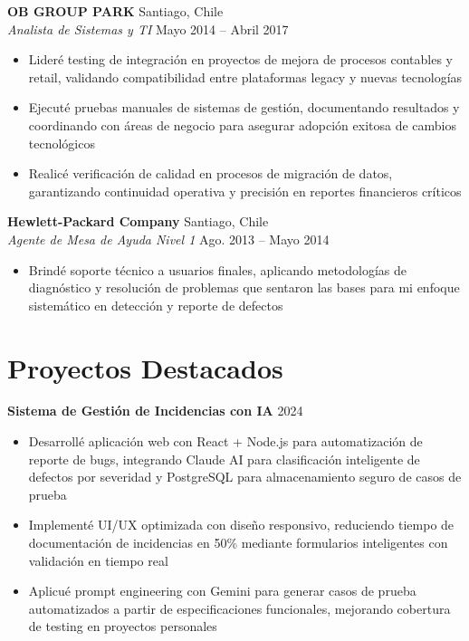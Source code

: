 \documentclass[11pt,letterpaper]{article}
\begin{document}
\vspace{2pt}
\textbf{OB GROUP PARK} \hfill Santiago, Chile\\
\textit{Analista de Sistemas y TI} \hfill Mayo 2014 – Abril 2017
\begin{itemize}
  \item Lideré testing de integración en proyectos de mejora de procesos contables y retail, validando compatibilidad entre plataformas legacy y nuevas tecnologías
  \item Ejecuté pruebas manuales de sistemas de gestión, documentando resultados y coordinando con áreas de negocio para asegurar adopción exitosa de cambios tecnológicos
  \item Realicé verificación de calidad en procesos de migración de datos, garantizando continuidad operativa y precisión en reportes financieros críticos
\end{itemize}
\vspace{2pt}
\textbf{Hewlett-Packard Company} \hfill Santiago, Chile\\
\textit{Agente de Mesa de Ayuda Nivel 1} \hfill Ago. 2013 – Mayo 2014
\begin{itemize}
  \item Brindé soporte técnico a usuarios finales, aplicando metodologías de diagnóstico y resolución de problemas que sentaron las bases para mi enfoque sistemático en detección y reporte de defectos
\end{itemize}

\section{Proyectos Destacados}

\textbf{Sistema de Gestión de Incidencias con IA} \hfill 2024
\begin{itemize}
  \item Desarrollé aplicación web con React + Node.js para automatización de reporte de bugs, integrando Claude AI para clasificación inteligente de defectos por severidad y PostgreSQL para almacenamiento seguro de casos de prueba
  \item Implementé UI/UX optimizada con diseño responsivo, reduciendo tiempo de documentación de incidencias en 50\% mediante formularios inteligentes con validación en tiempo real
  \item Aplicué prompt engineering con Gemini para generar casos de prueba automatizados a partir de especificaciones funcionales, mejorando cobertura de testing en proyectos personales
\end{itemize}
\end{document}
